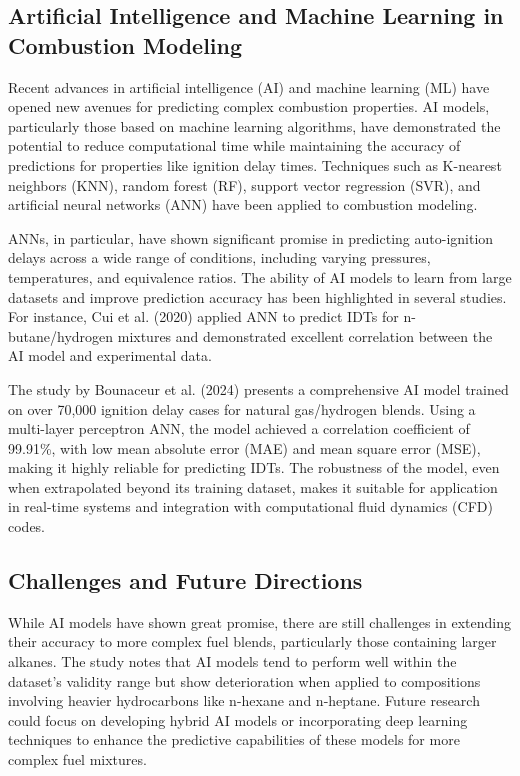 \documentclass[12pt]{report}
\begin{document}
\subsection{Artificial Intelligence and Machine Learning in Combustion Modeling}
Recent advances in artificial intelligence (AI) and machine learning (ML) have opened new avenues for predicting complex combustion properties. AI models, particularly those based on machine learning algorithms, have demonstrated the potential to reduce computational time while maintaining the accuracy of predictions for properties like ignition delay times. Techniques such as K-nearest neighbors (KNN), random forest (RF), support vector regression (SVR), and artificial neural networks (ANN) have been applied to combustion modeling.

ANNs, in particular, have shown significant promise in predicting auto-ignition delays across a wide range of conditions, including varying pressures, temperatures, and equivalence ratios. The ability of AI models to learn from large datasets and improve prediction accuracy has been highlighted in several studies. For instance, Cui et al. (2020) applied ANN to predict IDTs for n-butane/hydrogen mixtures and demonstrated excellent correlation between the AI model and experimental data.

The study by Bounaceur et al. (2024) presents a comprehensive AI model trained on over 70,000 ignition delay cases for natural gas/hydrogen blends. Using a multi-layer perceptron ANN, the model achieved a correlation coefficient of 99.91\%, with low mean absolute error (MAE) and mean square error (MSE), making it highly reliable for predicting IDTs. The robustness of the model, even when extrapolated beyond its training dataset, makes it suitable for application in real-time systems and integration with computational fluid dynamics (CFD) codes.

\subsection{Challenges and Future Directions}
While AI models have shown great promise, there are still challenges in extending their accuracy to more complex fuel blends, particularly those containing larger alkanes. The study notes that AI models tend to perform well within the dataset’s validity range but show deterioration when applied to compositions involving heavier hydrocarbons like n-hexane and n-heptane. Future research could focus on developing hybrid AI models or incorporating deep learning techniques to enhance the predictive capabilities of these models for more complex fuel mixtures.
\end{document}

